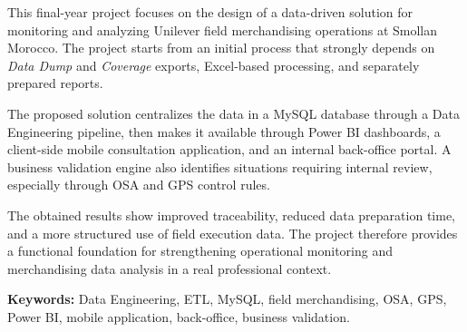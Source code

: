 {}
\thispagestyle{frontmatterstyle}


\begin{FrontTextBlock}
This final-year project focuses on the design of a data\mbox{-}driven solution for monitoring and analyzing Unilever field merchandising operations at Smollan Morocco. The project starts from an initial process that strongly depends on \textit{Data Dump} and \textit{Coverage} exports, Excel-based processing, and separately prepared reports.

The proposed solution centralizes the data in a MySQL database through a Data Engineering pipeline, then makes it available through Power BI dashboards, a client-side mobile consultation application, and an internal back-office portal. A business validation engine also identifies situations requiring internal review, especially through OSA and GPS control rules.

The obtained results show improved traceability, reduced data preparation time, and a more structured use of field execution data. The project therefore provides a functional foundation for strengthening operational monitoring and merchandising data analysis in a real professional context.

\vspace{0.8cm}

\noindent\textbf{Keywords:} Data Engineering, ETL, MySQL, field merchandising, OSA, GPS, Power BI, mobile application, back-office, business validation.
\end{FrontTextBlock}